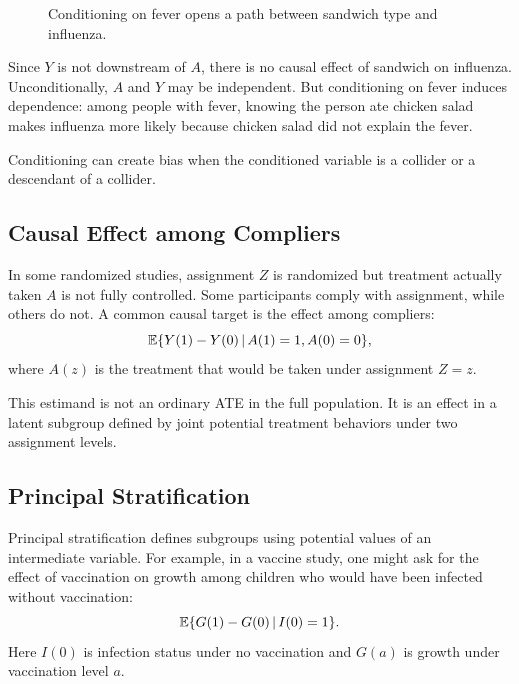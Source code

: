 \begin{figure}[H]
\centering
{}
\caption{Conditioning on fever opens a path between sandwich type and influenza.}
\end{figure}

Since $Y$ is not downstream of $A$, there is no causal effect of sandwich on influenza. Unconditionally, $A$ and $Y$ may be independent. But conditioning on fever induces dependence: among people with fever, knowing the person ate chicken salad makes influenza more likely because chicken salad did not explain the fever.

\begin{keyidea}
Conditioning can create bias when the conditioned variable is a collider or a descendant of a collider.
\end{keyidea}

\subsection{Causal Effect among Compliers}

In some randomized studies, assignment $Z$ is randomized but treatment actually taken $A$ is not fully controlled. Some participants comply with assignment, while others do not. A common causal target is the effect among compliers:
\[
\mathbb{E}\{Y(1)-Y(0)\,\vert\, A(1)=1,A(0)=0\},
\]
where $A(z)$ is the treatment that would be taken under assignment $Z=z$.

This estimand is not an ordinary ATE in the full population. It is an effect in a latent subgroup defined by joint potential treatment behaviors under two assignment levels.

\subsection{Principal Stratification}

Principal stratification defines subgroups using potential values of an intermediate variable. For example, in a vaccine study, one might ask for the effect of vaccination on growth among children who would have been infected without vaccination:
\[
\mathbb{E}\{G(1)-G(0)\,\vert\, I(0)=1\}.
\]
Here $I(0)$ is infection status under no vaccination and $G(a)$ is growth under vaccination level $a$.

